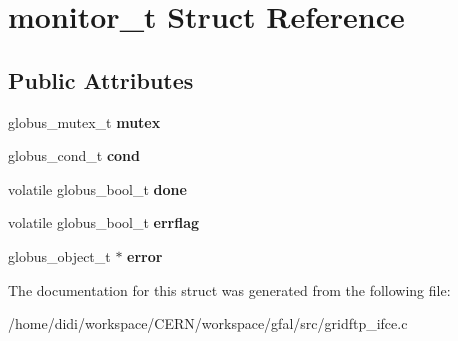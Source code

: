\section{monitor\_\-t Struct Reference}
\label{structmonitor__t}
\subsection*{Public Attributes}
\begin{DoxyCompactItemize}
\item 
globus\_\-mutex\_\-t {\bfseries mutex}\label{structmonitor__t_aa9976f522ea3b06e00ebceb199cacd11}

\item 
globus\_\-cond\_\-t {\bfseries cond}\label{structmonitor__t_a7fe649ef9aae9f351fc4a2225516cacb}

\item 
volatile globus\_\-bool\_\-t {\bfseries done}\label{structmonitor__t_a454372675acb6600754e661f77df06a4}

\item 
volatile globus\_\-bool\_\-t {\bfseries errflag}\label{structmonitor__t_a53c7ac5fc86474461ee5e4112503ed09}

\item 
globus\_\-object\_\-t $\ast$ {\bfseries error}\label{structmonitor__t_a116e17f7848b69b51ef5dcbdb9d077fd}

\end{DoxyCompactItemize}


The documentation for this struct was generated from the following file:\begin{DoxyCompactItemize}
\item 
/home/didi/workspace/CERN/workspace/gfal/src/gridftp\_\-ifce.c\end{DoxyCompactItemize}
